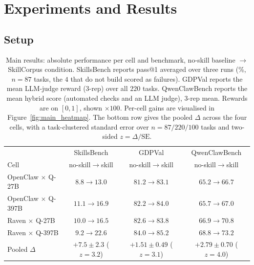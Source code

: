 \section{Experiments and Results}
\label{sec:experiments}

\subsection{Setup}
\label{sec:setup}

\begin{table}[!t]
\centering\small
\setlength{\tabcolsep}{7pt}
\begin{tabular}{@{}lccc@{}}
\toprule
 & SkillsBench & GDPVal & QwenClawBench \\
Cell & \scriptsize no-skill$\to$skill & \scriptsize no-skill$\to$skill & \scriptsize no-skill$\to$skill \\
\midrule
OpenClaw $\times$ Q-27B    & $8.8 \to 13.0$  & $81.2 \to 83.1$ & $65.2 \to 66.7$ \\
OpenClaw $\times$ Q-397B   & $11.1 \to 16.9$ & $82.2 \to 84.0$ & $65.7 \to 67.0$ \\
Raven $\times$ Q-27B       & $10.0 \to 16.5$ & $82.6 \to 83.8$ & $66.9 \to 70.8$ \\
Raven $\times$ Q-397B      & $9.2 \to \mathbf{22.6}$ & $84.0 \to 85.2$ & $68.8 \to 73.2$ \\
\midrule
Pooled $\Delta$ & $+7.5{\pm}2.3$ ($z{=}3.2$) & $+1.51{\pm}0.49$ ($z{=}3.1$) & $+2.79{\pm}0.70$ ($z{=}4.0$) \\
\bottomrule
\end{tabular}
\caption{Main results: absolute performance per cell and
benchmark, no-skill baseline $\to$ SkillCorpus condition.
SkillsBench reports pass@1 averaged over three runs
(\%, $n{=}87$ tasks, the $4$ that do not build scored as
failures).  GDPVal reports
the mean LLM-judge reward (3-rep) over all $220$ tasks.
QwenClawBench reports the mean hybrid
score (automated checks and an LLM judge), 3-rep mean.  Rewards are
on $[0,1]$, shown $\times 100$.  Per-cell gains are visualised in
Figure~\ref{fig:main_heatmap}.
The bottom row gives the pooled $\Delta$ across the four cells,
with a task-clustered standard error over $n{=}87/220/100$ tasks
and two-sided $z{=}\Delta/\mathrm{SE}$.}
\label{tab:main-eff}
\end{table}

